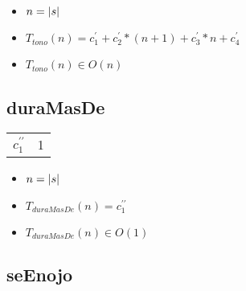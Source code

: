 \documentclass{article}
\begin{document}
    \begin{itemize}
        \item $n = |s|$
        \item $T_{tono}(n) = c^{\prime}_1 + c^{\prime}_2 * (n + 1) + c^{\prime}_3 * n + c^{\prime}_4 $
        \item $T_{tono}(n) \in O(n)$
    \end{itemize}

    \subsection*{duraMasDe}
    \begin{minipage}{0.70\textwidth}
        
    \end{minipage}
    \hfill
    \begin{minipage}{0.25\textwidth}
        \begin{tabular}{|c|c}
            $c^{\prime\prime}_1$ & 1 \\

        \end{tabular}
    \end{minipage}

    \begin{itemize}
        \item $n = |s|$
        \item $T_{duraMasDe}(n) = c^{\prime\prime}_1 $
        \item $T_{duraMasDe}(n) \in O(1)$
    \end{itemize}

    \subsection*{seEnojo}
\end{document}
